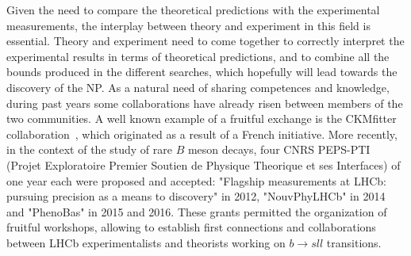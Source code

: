 Given the need to compare the theoretical predictions with the experimental measurements, the interplay between theory and experiment in this field is essential. Theory and experiment need to come together to correctly interpret the experimental results in terms of theoretical predictions, and to combine all the bounds produced in the different searches, which hopefully  will lead towards the discovery of the NP. 
 As a natural need of sharing competences and knowledge, during past years some collaborations have already risen between members of the two communities. A well known example of a fruitful exchange is the CKMfitter collaboration~\cite{Charles:2004jd}, which originated as a result of a French initiative. More recently, in the context of the study of rare $B$ meson decays, four  CNRS PEPS-PTI (Projet Exploratoire Premier Soutien de Physique Theorique et ses Interfaces) of one year each were proposed and accepted: "Flagship measurements at LHCb: pursuing precision as a means to discovery" in 2012, "NouvPhyLHCb" in 2014 and "PhenoBas" in 2015 and 2016. These grants permitted the organization of  fruitful workshops,  allowing to establish first connections and collaborations between LHCb experimentalists and theorists  working on $b \to sll$ transitions. 

